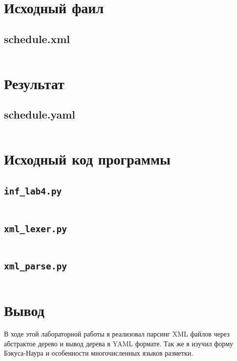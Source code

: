 \documentclass[11pt]{article}
\begin{document}
\section{Исходный фаил}
\subsection{schedule.xml}
\inputminted{xml}{../schedule.xml}
\pagebreak
\section{Результат}
\subsection{schedule.yaml}
\inputminted{yaml}{../schedule.yaml}
\pagebreak{}
\section{Исходный код программы}
\subsection{\texttt{inf\_lab4.py}}
\inputminted{python}{../inf_lab4.py}
\subsection{\texttt{xml\_lexer.py}}
\inputminted{python}{../xml_lexer.py}
\subsection{\texttt{xml\_parse.py}}
\inputminted{python}{../xml_parser.py}
\section{Вывод}
\large
В ходе этой лабораторной работы я реализовал парсинг XML файлов через абстрактое дерево и вывод дерева в YAML  формате. Так же я изучил форму  Бэкуса-Наура и особенности многочисленных языков разметки.
    
\end{document}
